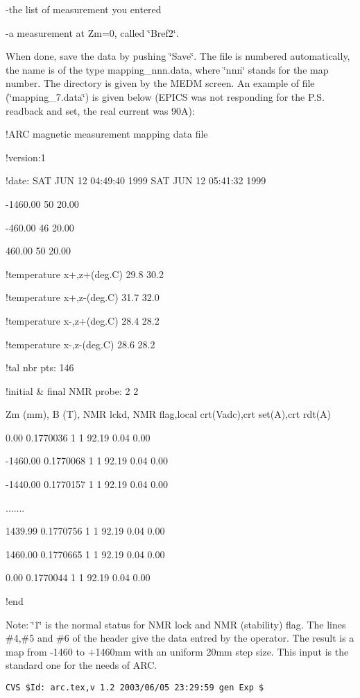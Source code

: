 -the list of measurement you entered 

-a measurement at Zm=0, called \char`\"{}Bref2\char`\"{}. 

When done, save the data by pushing \char`\"{}Save\char`\"{}. The file is numbered
automatically, the name is of the type mapping\_nnn.data, where \char`\"{}nnn\char`\"{}
stands for the map number. The directory is given by the MEDM screen. An example
of file (\char`\"{}mapping\_7.data\char`\"{}) is given below (EPICS was not
responding for the P.S. readback and set, the real current was 90A):

!ARC magnetic measurement mapping data file 

!version:1 

!date: SAT JUN 12 04:49:40 1999 SAT JUN 12 05:41:32 1999 

-1460.00 50 20.00 

-460.00 46 20.00 

460.00 50 20.00 

!temperature x+,z+(deg.C) 29.8 30.2 

!temperature x+,z-(deg.C) 31.7 32.0 

!temperature x-,z+(deg.C) 28.4 28.2 

!temperature x-,z-(deg.C) 28.6 28.2 

!tal nbr pts: 146 

!initial \& final NMR probe: 2 2 

Zm (mm), B (T), NMR lckd, NMR flag,local crt(Vadc),crt set(A),crt rdt(A) 

0.00 0.1770036 1 1 92.19 0.04 0.00 

-1460.00 0.1770068 1 1 92.19 0.04 0.00 

-1440.00 0.1770157 1 1 92.19 0.04 0.00 

....... 

1439.99 0.1770756 1 1 92.19 0.04 0.00 

1460.00 0.1770665 1 1 92.19 0.04 0.00 

0.00 0.1770044 1 1 92.19 0.04 0.00 

!end

Note: \char`\"{}1\char`\"{} is the normal status for NMR lock and NMR (stability)
flag. The lines \#4,\#5 and \#6 of the header give the data entred by the operator.
The result is a map from -1460 to +1460mm with an uniform 20mm step size. This
input is the standard one for the needs of ARC.

%
%
{\small
\begin{verbatim}CVS $Id: arc.tex,v 1.2 2003/06/05 23:29:59 gen Exp $\end{verbatim}
}
